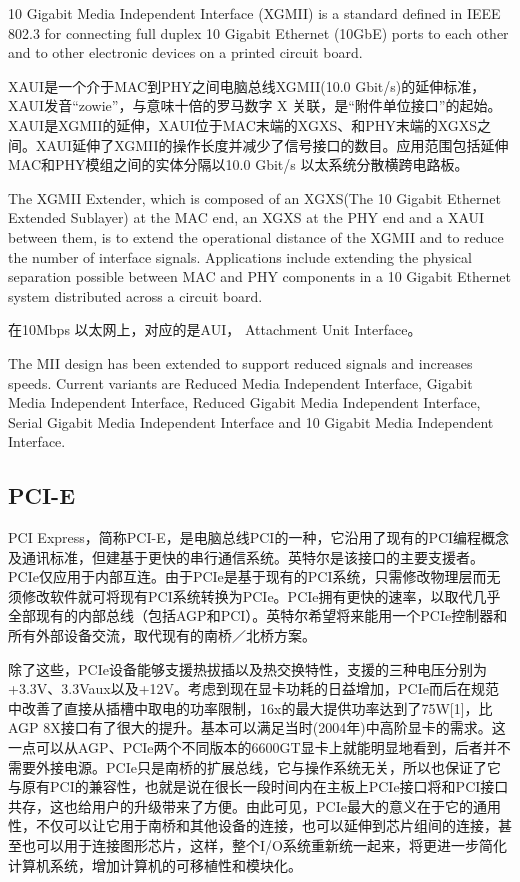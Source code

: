 10 Gigabit Media Independent Interface (XGMII) is a standard defined in IEEE 802.3 for connecting full duplex 10 Gigabit Ethernet (10GbE) ports to each other and to other electronic devices on a printed circuit board.

XAUI是一个介于MAC到PHY之间电脑总线XGMII(10.0 Gbit/s)的延伸标准，XAUI发音``zowie''，与意味十倍的罗马数字 X 关联，是“附件单位接口”的起始。
XAUI是XGMII的延伸，XAUI位于MAC末端的XGXS、和PHY末端的XGXS之间。XAUI延伸了XGMII的操作长度并减少了信号接口的数目。应用范围包括延伸MAC和PHY模组之间的实体分隔以10.0 Gbit/s 以太系统分散横跨电路板。

The XGMII Extender, which is composed of an XGXS(The 10 Gigabit Ethernet Extended Sublayer) at the MAC end, an XGXS at the PHY end and a XAUI between them, is to extend the operational distance of the XGMII and to reduce the number of interface signals. Applications include extending the physical separation possible between MAC and PHY components in a 10 Gigabit Ethernet system distributed across a circuit board.


在10Mbps 以太网上，对应的是AUI， Attachment Unit Interface。

The MII design has been extended to support reduced signals and increases speeds. Current variants are Reduced Media Independent Interface, Gigabit Media Independent Interface, Reduced Gigabit Media Independent Interface, Serial Gigabit Media Independent Interface and 10 Gigabit Media Independent Interface.

\subsection{PCI-E}
PCI Express，简称PCI-E，是电脑总线PCI的一种，它沿用了现有的PCI编程概念及通讯标准，但建基于更快的串行通信系统。英特尔是该接口的主要支援者。PCIe仅应用于内部互连。由于PCIe是基于现有的PCI系统，只需修改物理层而无须修改软件就可将现有PCI系统转换为PCIe。PCIe拥有更快的速率，以取代几乎全部现有的内部总线（包括AGP和PCI）。英特尔希望将来能用一个PCIe控制器和所有外部设备交流，取代现有的南桥／北桥方案。

除了这些，PCIe设备能够支援热拔插以及热交换特性，支援的三种电压分别为+3.3V、3.3Vaux以及+12V。考虑到现在显卡功耗的日益增加，PCIe而后在规范中改善了直接从插槽中取电的功率限制，16x的最大提供功率达到了75W[1]，比AGP 8X接口有了很大的提升。基本可以满足当时(2004年)中高阶显卡的需求。这一点可以从AGP、PCIe两个不同版本的6600GT显卡上就能明显地看到，后者并不需要外接电源。PCIe只是南桥的扩展总线，它与操作系统无关，所以也保证了它与原有PCI的兼容性，也就是说在很长一段时间内在主板上PCIe接口将和PCI接口共存，这也给用户的升级带来了方便。由此可见，PCIe最大的意义在于它的通用性，不仅可以让它用于南桥和其他设备的连接，也可以延伸到芯片组间的连接，甚至也可以用于连接图形芯片，这样，整个I/O系统重新统一起来，将更进一步简化计算机系统，增加计算机的可移植性和模块化。

